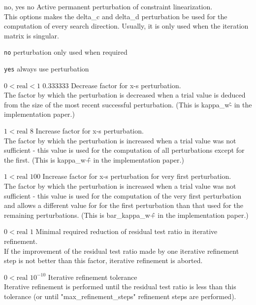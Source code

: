 %
{no, yes}%
{no}%
{Active permanent perturbation of constraint linearization.\\
This options makes the delta\_c and delta\_d perturbation be used for the computation of every search direction.  Usually, it is only used when the iteration matrix is singular.}%
{\begin{list}{}{
\setlength{\parsep}{0em}
\setlength{\leftmargin}{5ex}
\setlength{\labelwidth}{2ex}
\setlength{\itemindent}{0ex}
\setlength{\topsep}{0pt}}
\item[\texttt{no}] perturbation only used when required
\item[\texttt{yes}] always use perturbation
\end{list}
}

%
{$0<\textrm{real}<1$}%
{$0.333333$}%
{Decrease factor for x-s perturbation.\\
The factor by which the perturbation is decreased when a trial value is deduced from the size of the most recent successful perturbation. (This is kappa\_w\^- in the implementation paper.)}%
{}

%
{$1<\textrm{real}$}%
{$8$}%
{Increase factor for x-s perturbation.\\
The factor by which the perturbation is increased when a trial value was not sufficient - this value is used for the computation of all perturbations except for the first. (This is kappa\_w\^+ in the implementation paper.)}%
{}

%
{$1<\textrm{real}$}%
{$100$}%
{Increase factor for x-s perturbation for very first perturbation.\\
The factor by which the perturbation is increased when a trial value was not sufficient - this value is used for the computation of the very first perturbation and allows a different value for for the first perturbation than that used for the remaining perturbations. (This is bar\_kappa\_w\^+ in the implementation paper.)}%
{}

%
{$0<\textrm{real}$}%
{$1$}%
{Minimal required reduction of residual test ratio in iterative refinement.\\
If the improvement of the residual test ratio made by one iterative refinement step is not better than this factor, iterative refinement is aborted.}%
{}

%
{$0<\textrm{real}$}%
{$10^{-10}$}%
{Iterative refinement tolerance\\
Iterative refinement is performed until the residual test ratio is less than this tolerance (or until "max\_refinement\_steps" refinement steps are performed).}%
{}

